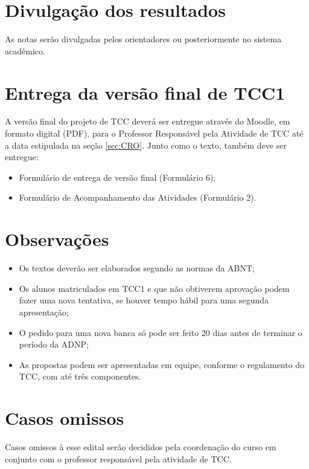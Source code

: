 \documentclass[a4paper, 12pt]{article}
\begin{document}
	\section{Divulgação dos resultados}
	
	As notas serão divulgadas pelos orientadores ou posteriormente no sistema acadêmico.
	
	\section{Entrega da versão final de TCC1}
	
	A versão final do projeto de TCC deverá ser entregue através do Moodle, em formato digital (PDF), para o Professor Responsável pela Atividade de TCC até a data estipulada na seção \ref{sec:CRO}. Junto como o texto, também deve ser entregue:
	
	\begin{itemize}
		\item Formulário de entrega de versão final (Formulário 6);
		\item Formulário de Acompanhamento das Atividades (Formulário 2).
	\end{itemize}
	
	\section{Observações}
	
	\begin{itemize}
		\item Os textos deverão ser elaborados segundo as normas da ABNT;
		
		\item Os alunos matriculados em TCC1 e que não obtiverem aprovação podem fazer uma nova tentativa, se houver tempo hábil para uma segunda apresentação;
		
		\item O pedido para uma nova banca só pode ser feito 20 dias antes de terminar o período da ADNP;
		
		\item As propostas podem ser apresentadas em equipe, conforme o regulamento do TCC, com até três componentes.
	\end{itemize}


	\section{Casos omissos}

	Casos omissos à esse edital serão decididos pela coordenação do curso em conjunto com o professor responsável pela atividade de TCC.
	

	
	
	
	
	
	
	
	

    
\end{document}
